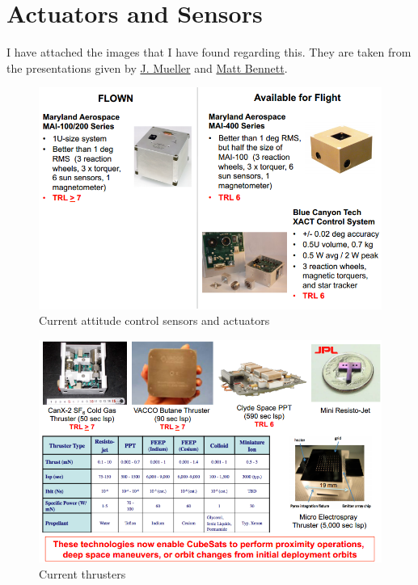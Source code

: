 \section{Actuators and Sensors}

I have attached the images that I have found regarding this. They are taken from the presentations given by \href{http://kiss.caltech.edu/workshops/smallsat2012b/presentations/mueller.pdf}{J.	Mueller} and \href{http://kiss.caltech.edu/workshops/smallsat2012b/presentations/bennett.pdf}{Matt Bennett}. 

\begin{center}
\begin{figure}[!ht]
\includegraphics[scale=0.7]{attitude_control.png}
\caption{Current attitude control sensors and actuators}
\end{figure}
\newpage
\begin{figure}[!ht]
\includegraphics[scale=0.7]{prop_available.png}
\caption{Current thrusters}
\end{figure}
\newpage
\end{center}
\newpage

